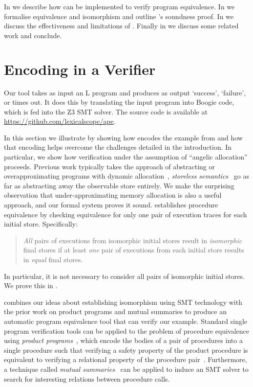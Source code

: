 \documentclass[runningheads,a4paper]{llncs}
\begin{document}
In  we describe how \metho{} can be implemented to verify program equivalence. In  we formalise equivalence and isomorphism and outline \metho{}'s soundness proof. In  we discuss the effectiveness and limitations of \metho{}. Finally in  we discuss some related work and conclude.

\section{Encoding in a Verifier}\label{sec:impl}


Our tool \tool{}  takes as input an L program  and produces as output `success', `failure', or times out. It does this by translating the input program into Boogie code, which is fed into the Z3 SMT solver. The source code is available at \url{https://github.com/lexicalscope/ape}.

In this section we illustrate \metho{} by showing how \tool{} encodes the example from  and how that encoding helps overcome the challenges detailed in the introduction. In particular, we show how verification under the assumption of ``angelic allocation'' proceeds.
Previous work typically takes the approach of abstracting or overapproximating programs with dynamic allocation~\cite{Tennent2000,Koutavas2006,Benton2007,Tzevelekos2012}, \emph{storeless semantics}~\cite{Bozga2003} go as far as abstracting away the observable store entirely. We make the surprising observation that under-approximating memory allocation is also a useful approach, and our formal system proves it sound. \metho{} establishes procedure equivalence by checking equivalence for only one pair of execution traces for each initial store. Specifically: \begin{quote}\emph{All} pairs of executions from isomorphic initial stores result in \emph{isomorphic} final stores if at least \emph{one} pair of executions from each initial store results in \emph{equal} final stores.\end{quote} In particular, it is not necessary to consider all pairs of isomorphic initial stores. We prove this in .

\metho{} combines our ideas about establishing isomorphism using SMT technology with the prior work on product programs and mutual summaries to produce an automatic program equivalence tool that can verify our example. Standard single program verification tools can be applied to the problem of procedure equivalence using \emph{product programs}~\cite{Barthe2004,Terauchi2005,Godlin09,Lahiri2012,Barthe2016}, which encode the bodies of a pair of procedures into a single procedure such that verifying a safety property of the product procedure is equivalent to verifying a relational property of the procedure pair~\cite{Barthe2016}. Furthermore, a technique called \emph{mutual summaries}~\cite{Hawblitzel2013} can be applied to induce an SMT solver to search for interesting relations between procedure calls.
\end{document}

